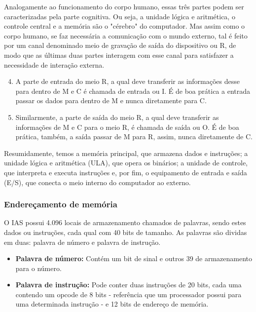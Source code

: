 \documentclass{article}
\begin{document}
        Analogamente ao funcionamento do corpo humano, essas três partes podem
        ser caracterizadas pela parte cognitiva. Ou seja, a unidade lógica e
        aritmética, o controle central e a memória são o "cérebro" do
        computador. Mas assim como o corpo humano, se faz necessária a
        comunicação com o mundo externo, tal é feito por um canal denominado
        meio de gravação de saída do dispositivo ou R, de modo que as últimas
        duas partes interagem com esse canal para satisfazer a necessidade de
        interação externa.

\begin{enumerate}
        \setcounter{enumi}{3}
    \item A parte de entrada do meio R, a qual deve transferir as informações
        desse para dentro de M e C é chamada de entrada ou I. É de boa prática a
        entrada passar os dados para dentro de M e nunca diretamente para C. 

    \item Similarmente, a parte de saída do meio R, a qual deve transferir as
        informações de M e C para o meio R, é chamada de saída ou O. É de boa
        prática, também, a saída passar de M para R, assim, nunca diretamente
        de C. 
\end{enumerate}

Resumidamente, temos a memória principal, que armazena dados e instruções; a
unidade lógica e aritmética (ULA), que opera os binários; a unidade de
controle, que interpreta e executa instruções e, por fim, o equipamento de
entrada e saída (E/S), que conecta o meio interno do computador ao externo.

\subsubsection{Endereçamento de memória}
O IAS possui 4.096 locais de armazenamento chamados de palavras, sendo estes
dados ou instruções, cada qual com 40 bits de tamanho. As palavras são dividas em duas:
palavra de número e palavra de instrução.

\begin{itemize}
    \item \textbf{Palavra de número:} Contém um bit de sinal e outros 39 de
        armazenamento para o número. 
    \item \textbf{Palavra de instrução:} Pode conter duas instruções de 20
        bits, cada uma contendo um opcode de 8 bits - referência que um
        processador possui para uma determinada instrução - e 12 bits de
        endereço de memória.
\end{itemize}
\end{document}
